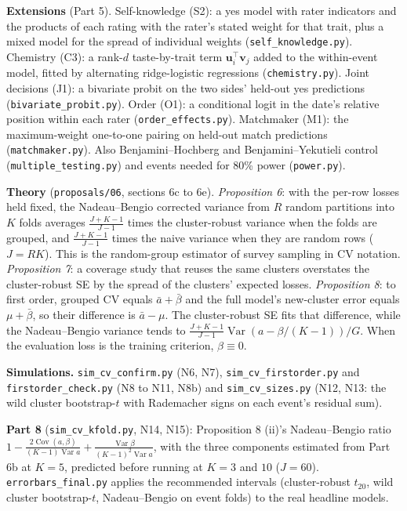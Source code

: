 \documentclass[11pt]{article}
\begin{document}
\textbf{Extensions} (Part 5). Self-knowledge (S2): a yes model with rater indicators and the products of each
rating with the rater's stated weight for that trait, plus a mixed model for the spread of individual weights
(\texttt{self\_knowledge.py}). Chemistry (C3): a rank-$d$ taste-by-trait term $\mathbf u_i^\top\mathbf v_j$ added to the within-event
model, fitted by alternating ridge-logistic regressions (\texttt{chemistry.py}). Joint decisions (J1): a bivariate probit on
the two sides' held-out yes predictions (\texttt{bivariate\_probit.py}). Order (O1): a conditional logit in the date's
relative position within each rater (\texttt{order\_effects.py}). Matchmaker (M1): the maximum-weight one-to-one pairing on
held-out match predictions (\texttt{matchmaker.py}). Also Benjamini--Hochberg and Benjamini--Yekutieli control
(\texttt{multiple\_testing.py}) and events needed for 80\% power (\texttt{power.py}).

\textbf{Theory} (\texttt{proposals/06}, sections 6c to 6e). \emph{Proposition 6}: with the per-row losses held fixed, the
Nadeau--Bengio corrected variance from $R$ random partitions into $K$ folds averages $\frac{J+K-1}{J-1}$ times the cluster-robust
variance when the folds are grouped, and $\frac{J+K-1}{J-1}$ times the naive variance when they are random rows ($J=RK$). This
is the random-group estimator of survey sampling in CV notation. \emph{Proposition 7}: a coverage study that reuses the same
clusters overstates the cluster-robust SE by the spread of the clusters' expected losses. \emph{Proposition 8}: to first
order, grouped CV equals $\bar a+\bar\beta$ and the full model's new-cluster error equals $\mu+\bar\beta$, so their difference is
$\bar a-\mu$. The cluster-robust SE fits that difference, while the Nadeau--Bengio variance tends to
$\frac{J+K-1}{J-1}\operatorname{Var}(a-\beta/(K-1))/G$. When the evaluation loss is the training criterion, $\beta\equiv 0$.

\textbf{Simulations.} \texttt{sim\_cv\_confirm.py} (N6, N7), \texttt{sim\_cv\_firstorder.py} and \texttt{firstorder\_check.py}
(N8 to N11, N8b) and \texttt{sim\_cv\_sizes.py} (N12, N13: the wild cluster bootstrap-$t$ with Rademacher signs on each
event's residual sum).

\textbf{Part 8} (\texttt{sim\_cv\_kfold.py}, N14, N15): Proposition 8 (ii)'s Nadeau--Bengio ratio
$1-\frac{2\operatorname{Cov}(a,\beta)}{(K-1)\operatorname{Var}a}+\frac{\operatorname{Var}\beta}{(K-1)^2\operatorname{Var}a}$, with the three components estimated from Part 6b at $K=5$,
predicted before running at $K=3$ and $10$ ($J=60$). \texttt{errorbars\_final.py} applies the recommended intervals
(cluster-robust $t_{20}$, wild cluster bootstrap-$t$, Nadeau--Bengio on event folds) to the real headline models.
\end{document}
